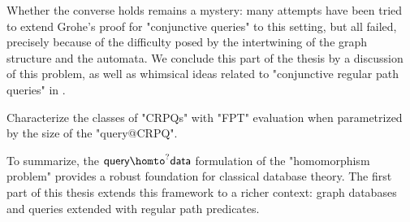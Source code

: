 Whether the converse holds remains a mystery: many attempts
have been tried to extend Grohe's proof for "conjunctive queries" to this setting,
but all failed, precisely because of the difficulty posed
by the intertwining of the graph structure and the automata.
We conclude this part of the thesis by a discussion of this problem,
as well as whimsical ideas related to "conjunctive regular path queries"
in .

\begin{openproblemintro}
	Characterize the classes of "CRPQs" with "FPT" evaluation
	when parametrized by the size of the "query@CRPQ".
\end{openproblemintro}

To summarize, the $\textsf{query} \homto^? \textsf{data}$ formulation of the "homomorphism problem" provides a robust foundation for classical database theory. The first part of this thesis extends this framework to a richer context: graph databases and queries extended with regular path predicates.